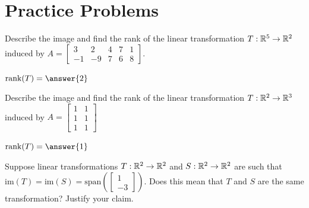 \documentclass{ximera}
\begin{document}
\section*{Practice Problems}
   \begin{problem}\label{prob:imagerankoflintrans1} Describe the image and find the rank of the linear transformation
  $T:\mathbb{R}^5\rightarrow \mathbb{R}^2$ induced by $A=\begin{bmatrix}3&2&4&7&1\\-1&-9&7&6&8\end{bmatrix}$.
  
  \begin{multipleChoice}
\end{multipleChoice}
  
  $\mbox{rank}(T)=\answer{2}$
  \end{problem}
  
  \begin{problem}\label{prob:imagerankoflintrans2} Describe the image and find the rank of the linear transformation
  $T:\mathbb{R}^2\rightarrow\mathbb{R}^3$ induced by $A=\begin{bmatrix}1&1\\1&1\\1&1\end{bmatrix}$
  
  \begin{multipleChoice}
\end{multipleChoice}
  
  $\mbox{rank}(T)=\answer{1}$
  \end{problem}



\begin{problem}\label{prob:sametrans} Suppose linear transformations $T:\mathbb{R}^2\rightarrow \mathbb{R}^2$ and $S:\mathbb{R}^2\rightarrow \mathbb{R}^2$ are such that  $\mbox{im}(T)=\mbox{im}(S)=\mbox{span}\left(\begin{bmatrix}1\\-3\end{bmatrix}\right)$.  Does this mean that $T$ and $S$ are the same transformation?  Justify your claim.
\end{problem}
\end{document}
